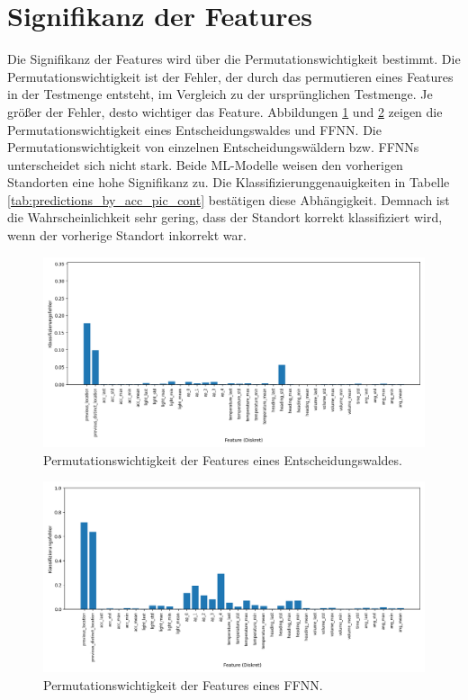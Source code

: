 \section{Signifikanz der Features}
Die Signifikanz der Features wird über die Permutationswichtigkeit bestimmt.
Die Permutationswichtigkeit ist der Fehler, der durch das permutieren eines Features in der Testmenge entsteht, im Vergleich zu der ursprünglichen Testmenge.
Je größer der Fehler, desto wichtiger das Feature.
\newline
\newline
Abbildungen \ref{fig:feature_significance_dt} und \ref{fig:feature_significance_knn} zeigen die Permutationswichtigkeit eines Entscheidungswaldes und FFNN.
Die Permutationswichtigkeit von einzelnen Entscheidungswäldern bzw. FFNNs unterscheidet sich nicht stark.
Beide ML-Modelle weisen den vorherigen Standorten eine hohe Signifikanz zu.
Die Klassifizierunggenauigkeiten in Tabelle \ref{tab:predictions_by_acc_pic_cont} bestätigen diese Abhängigkeit.
Demnach ist die Wahrscheinlichkeit sehr gering, dass der Standort korrekt klassifiziert wird, wenn der vorherige Standort inkorrekt war.
\begin{figure}[h!]
    \centering
    \includegraphics[width=\linewidth]{images/evaluation_feature_importance_dt_pi.png}
    \caption{Permutationswichtigkeit der Features eines Entscheidungswaldes.}
    \label{fig:feature_significance_dt}
\end{figure}
\begin{figure}[h!]
    \centering
    \includegraphics[width=\linewidth]{images/evaluation_feature_importance_knn_pi.png}
    \caption{Permutationswichtigkeit der Features eines FFNN.}
    \label{fig:feature_significance_knn}
\end{figure}
